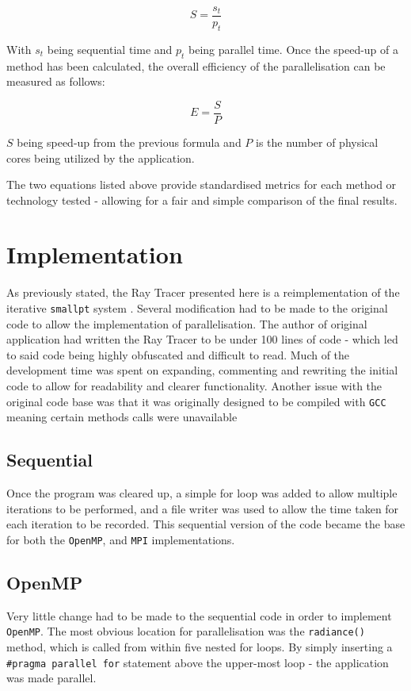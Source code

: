 \documentclass[journal,transmag]{IEEEtran}
\begin{document}
		\[S=\frac{s_{t}}{p_{t}}\]
		
		\noindent With \(s_{t}\) being sequential time and \(p_{t}\) being parallel time.
		Once the speed-up of a method has been calculated, the overall efficiency of the parallelisation can be measured as follows:
		
		\[E = \frac{S}{P}\]
		
		\noindent \(S\) being speed-up from the previous formula and \(P\) is the number of physical cores being utilized by the application.
		
		The two equations listed above provide standardised metrics for each method or technology tested - allowing for a fair and simple comparison of the final results.
		
\section{Implementation}
	As previously stated, the Ray Tracer presented here is a reimplementation of the iterative \texttt{smallpt} system \cite{smallptG75:online}. Several modification had to be made to the original code to allow the implementation of parallelisation. The author of original application had written the Ray Tracer to be under 100 lines of code - which led to said code being highly obfuscated and difficult to read. Much of the development time was spent on expanding, commenting and rewriting the initial code to allow for readability and clearer functionality. Another issue with the original code base was that it was originally designed to be compiled with \texttt{GCC} meaning certain methods calls were unavailable
	
	\subsection{Sequential}
		Once the program was cleared up, a simple for loop was added to allow multiple iterations to be performed, and a file writer was used to allow the time taken for each iteration to be recorded. This sequential version of the code became the base for both the \texttt{OpenMP}, and \texttt{MPI} implementations.
	
	\subsection{OpenMP}
		Very little change had to be made to the sequential code in order to implement \texttt{OpenMP}. The most obvious location for parallelisation was the \texttt{radiance()} method, which is called from within five nested for loops. By simply inserting a \texttt{\#pragma parallel for} statement above the upper-most loop - the application was made parallel.
		
\end{document}
